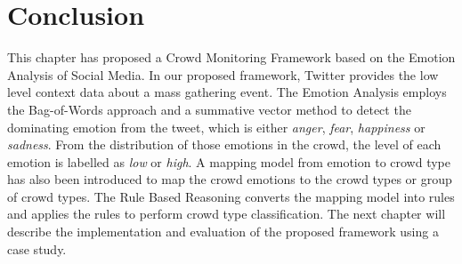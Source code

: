 \section{Conclusion}
This chapter has proposed a Crowd Monitoring Framework based on the Emotion Analysis of Social Media. In our proposed framework, Twitter provides the low level context data about a mass gathering event. The Emotion Analysis employs the Bag-of-Words approach and a summative vector method to detect the dominating emotion from the tweet, which is either \textit{anger}, \textit{fear}, \textit{happiness} or \textit{sadness}. From the distribution of those emotions in the crowd, the level of each emotion is labelled as \textit{low} or \textit{high}. A mapping model from emotion to crowd type has also been introduced to map the crowd emotions to the crowd types or group of crowd types. The Rule Based Reasoning converts the mapping model into rules and applies the rules to perform crowd type classification. The next chapter will describe the implementation and evaluation of the proposed framework using a case study.